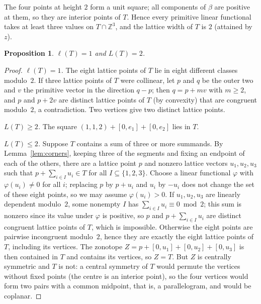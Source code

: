 \documentclass[11pt]{article}
\newtheorem{proposition}{Proposition}
\theoremstyle{definition}
\theoremstyle{remark}
\newcommand{\Z}{\mathbb Z}
\begin{document}
The four points at height $2$ form a unit square; all components of $\beta$
are positive at them, so they are interior points of $T$. Hence
every primitive linear functional takes at least three values on $T\cap\Z^3$,
and the lattice width of $T$ is $2$ (attained by $z$).

\begin{proposition}\label{prop:T}
$\ell(T)=1$ and $L(T)=2$.
\end{proposition}

\begin{proof}
\emph{$\ell(T)=1$.} The eight lattice points of $T$ lie in eight different
classes modulo~$2$. If three lattice points of $T$ were collinear, let $p$ and
$q$ be the outer two and $v$ the primitive vector in the direction $q-p$; then
$q=p+mv$ with $m\ge2$, and $p$ and $p+2v$ are distinct lattice points of $T$
(by convexity) that are congruent modulo~$2$, a contradiction. Two vertices
give two distinct lattice points.

\emph{$L(T)\ge2$.} The square $(1,1,2)+[0,e_1]+[0,e_2]$ lies in $T$.

\emph{$L(T)\le2$.} Suppose $T$ contains a sum of three or more summands. By
Lemma~\ref{lem:corners}, keeping three of the segments and fixing an endpoint
of each of the others, there are a lattice point $p$ and nonzero lattice
vectors $u_1,u_2,u_3$ such that $p+\sum_{i\in I}u_i\in T$ for all
$I\subseteq\{1,2,3\}$. Choose a linear functional $\varphi$ with
$\varphi(u_i)\ne0$ for all $i$; replacing $p$ by $p+u_i$ and $u_i$ by $-u_i$
does not change the set of these eight points, so we may assume
$\varphi(u_i)>0$. If $u_1,u_2,u_3$ are linearly dependent modulo~$2$, some
nonempty $I$ has $\sum_{i\in I}u_i\equiv0\bmod 2$; this sum is nonzero since
its value under $\varphi$ is positive, so $p$ and $p+\sum_{i\in I}u_i$ are
distinct congruent lattice points of $T$, which is impossible. Otherwise the
eight points are pairwise incongruent modulo~$2$, hence they are exactly the
eight lattice points of $T$, including its vertices. The zonotope
$Z=p+[0,u_1]+[0,u_2]+[0,u_3]$ is then contained in $T$ and contains its
vertices, so $Z=T$. But $Z$ is centrally symmetric and $T$ is not: a central
symmetry of $T$ would permute the vertices without fixed points (the centre is
an interior point), so the four vertices would form two pairs with a common
midpoint, that is, a parallelogram, and would be coplanar.
\end{proof}
\end{document}
